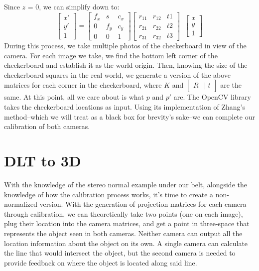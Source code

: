 \documentclass[
    12pt,
    twoside,
    bibstyle=chicago,
    headerstyle=uppercase,
	bibfile=thesis.bib
]{reedthesis}
\newcommand{\rt}{\left[\begin{smallmatrix}R &|\; t\end{smallmatrix}\right]}
\begin{document}
Since $z$ = 0, we can simplify down to:
\[\begin{bmatrix}x' \\ y' \\ 1\end{bmatrix} = \begin{bmatrix}f_x & s & c_x \\ 0 & f_y & c_y \\ 0 & 0 & 1\end{bmatrix} \begin{bmatrix} r_{11}&r_{12}&t{1}\\r_{21}&r_{22}&t{2}\\r_{31}&r_{32}&t{3}\end{bmatrix}\;\;\begin{bmatrix}x \\ y \\ 1\end{bmatrix} \]
During this process, we take multiple photos of the checkerboard in view of the camera. For each image we take, we find the bottom left corner of the checkerboard and establish it as the world origin. Then, knowing the size of the checkerboard squares in the real world, we generate a version of the above matrices for each corner in the checkerboard, where $K$ and $\rt$ are the same. At this point, all we care about is what $p$ and $p'$ are. The OpenCV library takes the checkerboard locations as input. Using its implementation of Zhang's method--which we will treat as a black box for brevity's sake--we can complete our calibration of both cameras.

\section{DLT to 3D}
With the knowledge of the stereo normal example under our belt, alongside the knowledge of how the calibration process works, it's time to create a non-normalized version. With the generation of projection matrices for each camera through calibration, we can theoretically take two points (one on each image), plug their location into the camera matrices, and get a point in three-space that represents the object seen in both cameras. Neither camera can output all the location information about the object on its own. A single camera can calculate the line that would intersect the object, but the second camera is needed to provide feedback on where the object is located along said line.
\end{document}
